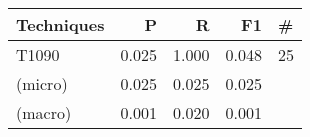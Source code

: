 \begin{tabular}{lrrrl}
    \toprule
    Techniques & P     & R     & F1    & \# \\
    \midrule
    T1090      & 0.025 & 1.000 & 0.048 & 25 \\
    (micro)    & 0.025 & 0.025 & 0.025 &    \\
    (macro)    & 0.001 & 0.020 & 0.001 &    \\
    \bottomrule
\end{tabular}
